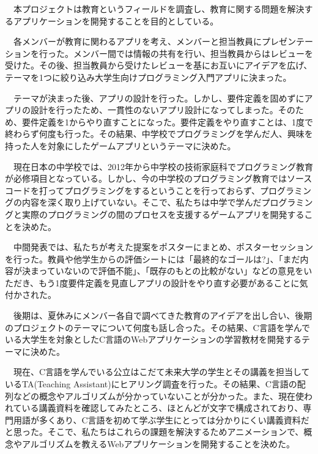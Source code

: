 \documentclass[openany,11pt,papersize]{jsbook}
\newcounter{hoge}
\newcommand{\fake}[1]{\whiledo{\thehoge<70}{#1\stepcounter{hoge}}%
  \setcounter{hoge}{0}}
\begin{document}
%
\maketitle

\frontmatter

\begin{jabstract} 
　本プロジェクトは教育というフィールドを調査し、教育に関する問題を解決するアプリケーションを開発することを目的としている。

　各メンバーが教育に関わるアプリを考え、メンバーと担当教員にプレゼンテーションを行った。メンバー間では情報の共有を行い、担当教員からはレビューを受けた。その後、担当教員から受けたレビューを基にお互いにアイデアを広げ、テーマを1つに絞り込み大学生向けプログラミング入門アプリに決まった。

　テーマが決まった後、アプリの設計を行った。しかし、要件定義を固めずにアプリの設計を行ったため、一貫性のないアプリ設計になってしまった。そのため、要件定義を1からやり直すことになった。要件定義をやり直すことは、1度で終わらず何度も行った。その結果、中学校でプログラミングを学んだ人、興味を持った人を対象にしたゲームアプリというテーマに決めた。

　現在日本の中学校では、2012年から中学校の技術家庭科でプログラミング教育が必修項目となっている。しかし、今の中学校のプログラミング教育ではソースコードを打ってプログラミングをするということを行っておらず、プログラミングの内容を深く取り上げていない。そこで、私たちは中学で学んだプログラミングと実際のプログラミングの間のプロセスを支援するゲームアプリを開発することを決めた。

　中間発表では、私たちが考えた提案をポスターにまとめ、ポスターセッションを行った。教員や他学生からの評価シートには「最終的なゴールは?」、「まだ内容が決まっていないので評価不能」、「既存のもとの比較がない」などの意見をいただき、もう1度要件定義を見直しアプリの設計をやり直す必要があることに気付かされた。

　後期は、夏休みにメンバー各自で調べてきた教育のアイデアを出し合い、後期のプロジェクトのテーマについて何度も話し合った。その結果、C言語を学んでいる大学生を対象としたC言語のWebアプリケーションの学習教材を開発するテーマに決めた。

　現在、C言語を学んでいる公立はこだて未来大学の学生とその講義を担当しているTA(Teaching Assistant)にヒアリング調査を行った。その結果、C言語の配列などの概念やアルゴリズムが分かっていないことが分かった。また、現在使われている講義資料を確認してみたところ、ほとんどが文字で構成されており、専門用語が多くあり、C言語を初めて学ぶ学生にとっては分かりにくい講義資料だと思った。そこで、私たちはこれらの課題を解決するためアニメーションで、概念やアルゴリズムを教えるWebアプリケーションを開発することを決めた。


\end{jabstract}
\end{document}
